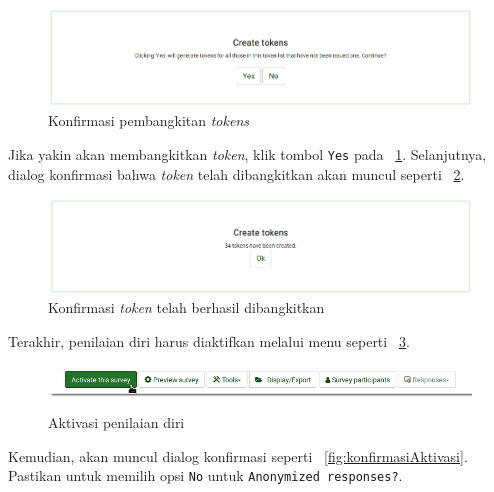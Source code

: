 \begin{figure}
  \begin{center}
    \includegraphics[scale=.5]{pics/konfirmasiTokens.png}
    \caption{Konfirmasi pembangkitan \textit{tokens}}
    \label{fig:generateTokens}
  \end{center}
\end{figure}

Jika yakin akan membangkitkan \textit{token}, klik tombol \texttt{Yes} pada \figurename~\ref{fig:generateTokens}. Selanjutnya, dialog konfirmasi bahwa \textit{token} telah dibangkitkan akan muncul seperti \figurename~\ref{fig:tokenGenerated}.

\begin{figure}
  \begin{center}
    \includegraphics[scale=.5]{pics/tokenGenerated.png}
    \caption{Konfirmasi \textit{token} telah berhasil dibangkitkan}
    \label{fig:tokenGenerated}
  \end{center}
\end{figure}

Terakhir, penilaian diri harus diaktifkan melalui menu seperti \figurename~\ref{fig:aktivasi}. 

\begin{figure}
  \begin{center}
    \includegraphics[scale=.5]{pics/aktivasiSurvey.png}
    \caption{Aktivasi penilaian diri}
    \label{fig:aktivasi}
  \end{center}
\end{figure}

Kemudian, akan muncul dialog konfirmasi seperti \figurename~\ref{fig:konfirmasiAktivasi}. Pastikan untuk memilih opsi \texttt{No} untuk \texttt{Anonymized responses?}. 

